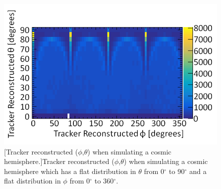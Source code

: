\begin{figure}[!h]
  \centering
  \includegraphics[width=0.7\linewidth]{Chapter6/Figs/Raster/pvsTFiduicalHemisphereMedText.png}
  [Tracker reconstructed ($\phi$,$\theta$) when simulating a cosmic hemisphere.]{Tracker reconstructed ($\phi$,$\theta$) when simulating a cosmic hemisphere which has a flat distribution in $\theta$ from 0$^\circ$ to 90$^\circ$ and a flat distribution in $\phi$ from 0$^\circ$ to 360$^\circ$.}
  \label{fig:simulatedHemisphereDist}
\end{figure}

